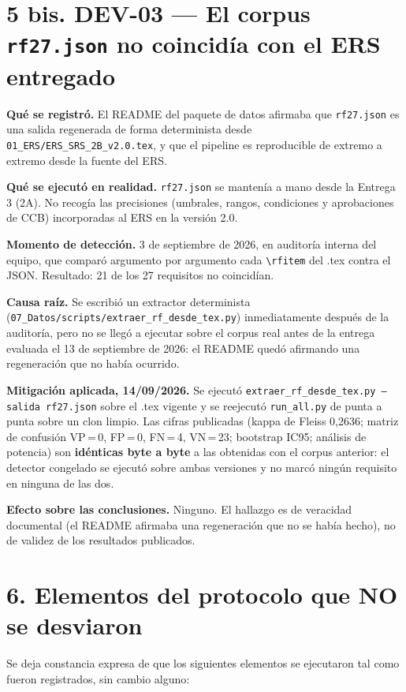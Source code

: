 \documentclass[11pt,a4paper]{article}
\begin{document}
\section*{5 bis. DEV-03 --- El corpus \texttt{rf27.json} no coincidía con el
ERS entregado}

\textbf{Qué se registró.} El README del paquete de datos afirmaba que
\texttt{rf27.json} es una salida regenerada de forma determinista desde
\texttt{01\_ERS/ERS\_SRS\_2B\_v2.0.tex}, y que el pipeline es reproducible de
extremo a extremo desde la fuente del ERS.

\textbf{Qué se ejecutó en realidad.} \texttt{rf27.json} se mantenía a mano
desde la Entrega 3 (2A). No recogía las precisiones (umbrales, rangos,
condiciones y aprobaciones de CCB) incorporadas al ERS en la versión 2.0.

\textbf{Momento de detección.} 3 de septiembre de 2026, en auditoría interna
del equipo, que comparó argumento por argumento cada \verb|\rfitem| del .tex
contra el JSON. Resultado: 21 de los 27 requisitos no coincidían.

\textbf{Causa raíz.} Se escribió un extractor determinista
(\texttt{07\_Datos/scripts/extraer\_rf\_desde\_tex.py}) inmediatamente después
de la auditoría, pero no se llegó a ejecutar sobre el corpus real antes de la
entrega evaluada el 13 de septiembre de 2026: el README quedó afirmando una
regeneración que no había ocurrido.

\textbf{Mitigación aplicada, 14/09/2026.} Se ejecutó
\texttt{extraer\_rf\_desde\_tex.py --salida rf27.json} sobre el .tex vigente y
se reejecutó \texttt{run\_all.py} de punta a punta sobre un clon limpio. Las
cifras publicadas (kappa de Fleiss 0,2636; matriz de confusión
VP\,=\,0, FP\,=\,0, FN\,=\,4, VN\,=\,23; bootstrap IC95; análisis de potencia)
son \textbf{idénticas byte a byte} a las obtenidas con el corpus anterior: el
detector congelado se ejecutó sobre ambas versiones y no marcó ningún
requisito en ninguna de las dos.

\textbf{Efecto sobre las conclusiones.} Ninguno. El hallazgo es de veracidad
documental (el README afirmaba una regeneración que no se había hecho), no de
validez de los resultados publicados.

\section*{6. Elementos del protocolo que NO se desviaron}

Se deja constancia expresa de que los siguientes elementos se ejecutaron tal
como fueron registrados, sin cambio alguno:
\end{document}
